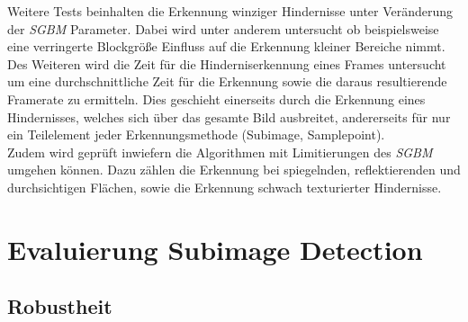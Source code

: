 \noindent
Weitere Tests beinhalten die Erkennung winziger Hindernisse unter Veränderung der \emph{SGBM} Parameter. Dabei wird unter anderem untersucht ob beispielsweise eine verringerte Blockgröße Einfluss auf die Erkennung kleiner Bereiche nimmt. Des Weiteren wird die Zeit für die Hinderniserkennung eines Frames untersucht um eine durchschnittliche Zeit für die Erkennung sowie die daraus resultierende Framerate zu ermitteln. Dies geschieht einerseits durch die Erkennung eines Hindernisses, welches sich über das gesamte Bild ausbreitet, andererseits für nur ein Teilelement jeder Erkennungsmethode (Subimage, Samplepoint).\\
Zudem wird geprüft inwiefern die Algorithmen mit Limitierungen des \emph{SGBM} umgehen können. Dazu zählen die Erkennung bei spiegelnden, reflektierenden und durchsichtigen Flächen, sowie die Erkennung schwach texturierter Hindernisse.\\



\section{Evaluierung Subimage Detection}
\label{sec:evaluierung_subimage}

    \subsection{Robustheit}
    \label{subsec:subimage_robustheit}
    
    
